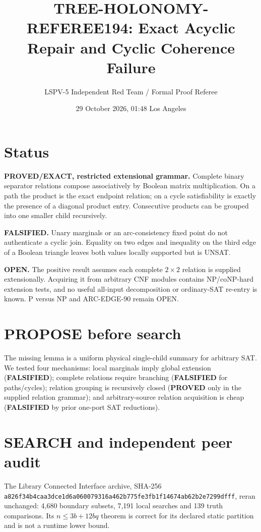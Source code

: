 \documentclass[11pt]{article}
\title{TREE-HOLONOMY-REFEREE194: Exact Acyclic Repair and Cyclic Coherence Failure}
\author{LSPV-5 Independent Red Team / Formal Proof Referee}
\date{29 October 2026, 01:48 Los Angeles}
\begin{document}
\maketitle

\section*{Status}
\textbf{PROVED/EXACT, restricted extensional grammar.}
Complete binary separator relations compose associatively by Boolean matrix
multiplication. On a path the product is the exact endpoint relation; on a
cycle satisfiability is exactly the presence of a diagonal product entry.
Consecutive products can be grouped into one smaller child recursively.

\textbf{FALSIFIED.} Unary marginals or an arc-consistency fixed point do not
authenticate a cyclic join. Equality on two edges and inequality on the third
edge of a Boolean triangle leaves both values locally supported but is UNSAT.

\textbf{OPEN.} The positive result assumes each complete $2\times2$ relation
is supplied extensionally. Acquiring it from arbitrary CNF modules contains
NP/coNP-hard extension tests, and no useful all-input decomposition or
ordinary-SAT re-entry is known. P versus NP and ARC-EDGE-90 remain OPEN.

\section{PROPOSE before search}
The missing lemma is a uniform physical single-child summary for arbitrary SAT.
We tested four mechanisms: local marginals imply global extension
(\textbf{FALSIFIED}); complete relations require branching
(\textbf{FALSIFIED} for paths/cycles); relation grouping is recursively closed
(\textbf{PROVED} only in the supplied relation grammar); and arbitrary-source
relation acquisition is cheap (\textbf{FALSIFIED} by prior one-port SAT
reductions).

\section{SEARCH and independent peer audit}
The Library Connected Interface archive, SHA-256
\texttt{a826f34b4caa3dce1d6a060079316a462b775fe3fb1f14674ab62b2e7299dfff},
reran unchanged: 4,680 boundary subsets, 7,191 local searches and 139 truth
comparisons. Its $n\le3b+12bq$ theorem is correct for its declared static
partition and is not a runtime lower bound.
\end{document}
